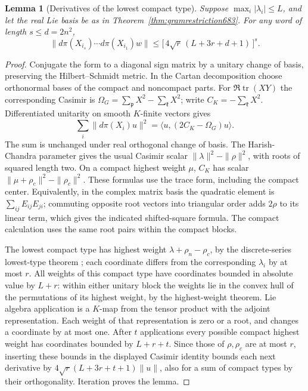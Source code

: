 \documentclass[a4paper,11pt]{article}
\newtheorem{lemma}[proposition]{Lemma}
\theoremstyle{definition}
\theoremstyle{remark}
\numberwithin{equation}{section}
\begin{document}
\begin{lemma}[Derivatives of the lowest compact type]
\leavevmode\label{lem:casimirs684}
Suppose \(\max_i|\lambda_i|\le L\), and let the real Lie basis
be as in Theorem~\ref{thm:gramrestriction683}. For any word
of length \(s\le d=2n^2\),
\[
       \|d\pi(X_{i_s})\cdots d\pi(X_{i_1})w\|
           \le \big[\,4\sqrt r\,(L+3r+d+1)\,\big]^s .
\]
\end{lemma}
\begin{proof}
Conjugate the form to a diagonal sign matrix by a unitary
change of basis, preserving the Hilbert--Schmidt metric.
In the Cartan decomposition choose orthonormal bases of the
compact and noncompact parts. For \(\Re\operatorname{tr}(XY)\)
the corresponding Casimir is
\(\Omega_G=\sum_{\mathfrak p}X^2-\sum_{\mathfrak k}X^2\);
write \(C_K=-\sum_{\mathfrak k}X^2\). Differentiated unitarity
on smooth \(K\)-finite vectors gives
\[
 \sum_i\|d\pi(X_i)u\|^2
      =\langle u,(2C_K-\Omega_G)u\rangle .
\]
The sum is unchanged under real orthogonal change of basis.
The Harish-Chandra parameter gives the usual Casimir scalar
\(\|\lambda\|^2-\|\rho\|^2\), with roots of squared length two.
On a compact highest weight \(\mu\), \(C_K\) has scalar
\(\|\mu+\rho_c\|^2-\|\rho_c\|^2\). These formulas use the
trace form, including the compact center. Equivalently, in
the complex matrix basis the quadratic element is
\(\sum_{ij}E_{ij}E_{ji}\); commuting opposite root vectors
into triangular order adds \(2\rho\) to its linear term,
which gives the indicated shifted-square formula. The compact
calculation uses the same root pairs within the compact blocks.

The lowest compact type has highest weight
\(\lambda+\rho_n-\rho_c\), by the discrete-series lowest-type
theorem \cite{XXV-XX-XX-blattner684}; each coordinate differs from
the corresponding \(\lambda_i\) by at most \(r\).
All weights of this compact type have coordinates bounded in
absolute value by \(L+r\): within either unitary block the
weights lie in the convex hull of the permutations of its
highest weight, by the highest-weight theorem. Lie algebra
application is a \(K\)-map from the tensor product with the
adjoint representation. Each weight of that representation is
zero or a root, and changes a coordinate by at most one.
After \(t\) applications every possible compact highest weight
has coordinates bounded by \(L+r+t\). Since those of
\(\rho,\rho_c\) are at most \(r\), inserting these bounds in
the displayed Casimir identity bounds each next derivative by
\(4\sqrt r(L+3r+t+1)\|u\|\), also for a sum of compact types
by their orthogonality. Iteration proves the lemma.
\end{proof}
\end{document}
